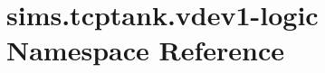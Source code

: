 \section{sims.\+tcptank.\+vdev1-\/logic Namespace Reference}
\label{namespacesims_1_1tcptank_1_1vdev1-logic}
